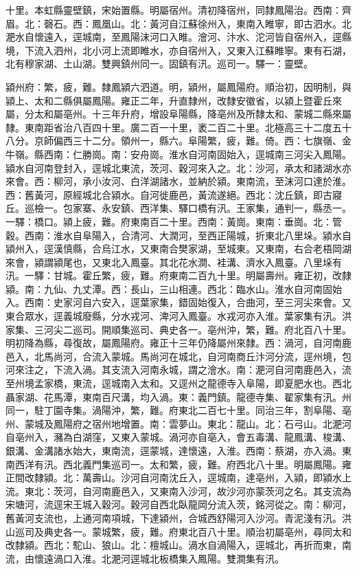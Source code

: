 \begin{pinyinscope}
十里。本虹縣靈壁鎮，宋始置縣。明屬宿州。清初降宿州，同隸鳳陽治。西南：齊眉。北：磬石。西：鳳凰山。北：黃河自江蘇徐州入，東南入睢寧，即古泗水。北淝水自懷遠入，逕城南，至鳳陽沫河口入睢。澮河、汴水、沱河皆自宿州入，逕縣境，下流入泗州，北小河上流即睢水，亦自宿州入，又東入江蘇睢寧。東有石湖，北有穆家湖、土山湖。雙興鎮州同一。固鎮有汛。巡司一。驛一：靈壁。

潁州府：繁，疲，難。隸鳳潁六泗道。明，潁州，屬鳳陽府。順治初，因明制，與潁上、太和二縣俱屬鳳陽。雍正二年，升直隸州，改隸安徽省，以潁上暨霍丘來屬，分太和屬亳州。十三年升府，增設阜陽縣，降亳州及所隸太和、蒙城二縣來屬隸。東南距省治八百四十里。廣二百一十里，袤二百二十里。北極高三十二度五十八分。京師偏西三十二分。領州一，縣六。阜陽繁，疲，難。倚。西：七旗嶺、金牛嶺。縣西南：仁勝崗。南：安舟崗。淮水自河南固始入，逕城南三河尖入鳳陽。潁水自河南登封入，逕城北東流，茨河、穀河來入之。北：沙河，承太和諸湖水亦來會。西：柳河，承小汝河、白洋湖諸水，並納於潁。東南流，至沫河口達於淮。西：舊黃河，原經城北合潁水。自河徙鹿邑，黃流遂絕。西北：沈丘鎮，即古寢丘。巡檢一。包家寨、永安鎮、西洋集、驛口橋有汛。王家集，通判一，縣丞一。一驛：橋口。潁上疲，難。府東南百二十里。西南：黃崗。東南：垂崗。北：管穀。西南：淮水自阜陽入，合清河、大潤河，至西正陽城，折東北八里垛。潁水自潁州入，逕漢慎縣，合烏江水，又東南合樊家湖，至城東。又東南，右合老梧岡湖來會，潁謂潁尾也，又東北入鳳臺。其北花水澗、袿溝、濟水入鳳臺。八里垛有汛。一驛：甘城。霍丘繁，疲，難。府東南二百九十里。明屬壽州。雍正初，改隸潁。南：九仙、九丈潭。西：長山，三山相連。西北：臨水山。淮水自河南固始入。西南：史家河自六安入，逕葉家集，錯固始復入，合曲河，至三河尖來會。又東合眾水，逕義城廢縣，分水戎河、渒河入鳳臺。水戎河亦入淮。葉家集有汛。洪家集、三河尖二巡司。開順集巡司、典史各一。亳州沖，繁，難。府北百八十里。明初降為縣，尋復故，屬鳳陽府。雍正十三年仍降屬州來隸。西：渦河，自河南鹿邑入，北馬尚河，合流入蒙城。馬尚河在城北，自河南商丘汴河分流，逕州境，包河來注之，下流入渦。其支流入河南永城，謂之澮水。南：淝河自河南鹿邑入，流至州境孟家橋，東流，逕城南入太和。又逕州之龍德寺入阜陽，即夏肥水也。西北聶家湖、花馬潭，東南百尺溝，均入渦。東：義門鎮。龍德寺集、翟家集有汛。州同一，駐丁園寺集。渦陽沖，繁，難。府東北二百七十里。同治三年，割阜陽、亳州、蒙城及鳳陽府之宿州地增置。南：雲夢山。東北：龍山。北：石弓山。北淝河自亳州入，瀦為白湖窪，又東入蒙城。渦河亦自亳入，會五毒溝、龍鳳溝、梭溝、銀溝、金溝諸水始大，東南流，逕蒙城，達懷遠，入淮。西南：蔡湖，亦入渦。東南西洋有汛。西北義門集巡司一。太和繁，疲，難。府西北八十里。明屬鳳陽。雍正間改隸潁。北：萬壽山。沙河自河南沈丘入，逕城南，達亳州，入潁，即潁水上流。東北：茨河，自河南鹿邑入，又東南入沙河，故沙河亦蒙茨河之名。其支流為宋塘河，流逕宋王城入穀河。穀河自西北臥龍岡分流入茨，銘河從之。南：柳河，舊黃河支流也，上通河南項城，下達潁州，合城西舒陽河入沙河。青泥淺有汛。洪山巡司及典史各一。蒙城繁，疲，難。府東北百八十里。順治初屬亳州，尋同太和改隸潁。西北：駝山、狼山。北：檀城山。渦水自渦陽入，逕城北，再折而東，南流，由懷遠渦口入淮。北淝河逕城北板橋集入鳳陽。雙澗集有汛。


\end{pinyinscope}

